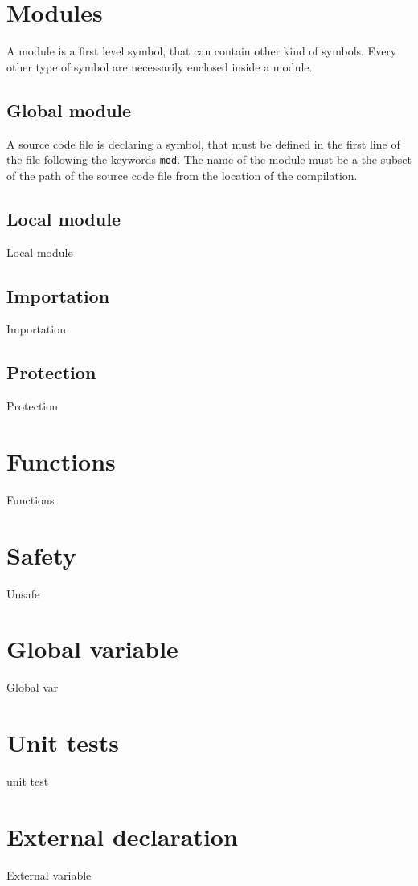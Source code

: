 \section{Modules}%
\label{sec:modules}

A module is a first level symbol, that can contain other kind of symbols. Every
other type of symbol are necessarily enclosed inside a module.

\subsection{Global module}

A source code file is declaring a symbol, that must be defined in the first line
of the file following the keywords \texttt{mod}. The name of the module must be
a the subset of the path of the source code file from the location of the
compilation.

\subsection{Local module}

Local module

\subsection{Importation}

Importation

\subsection{Protection}

Protection

\section{Functions}%
\label{sec:functions}

Functions

\section{Safety}%
\label{sec:unsafe}

Unsafe

\section{Global variable}%
\label{sec:global_variables}

Global var

\section{Unit tests}%
\label{sec:unit_test}

unit test

\section{External declaration}%
\label{sec:extern_var}

External variable
